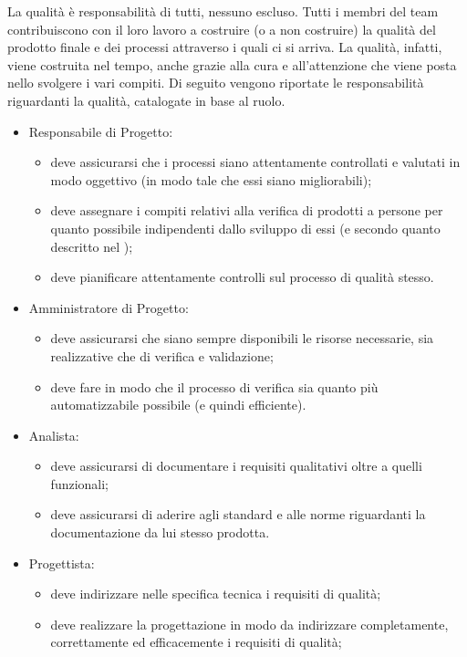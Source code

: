 			La qualità è responsabilità di tutti, nessuno escluso. Tutti i membri del team contribuiscono con il loro lavoro a costruire (o a non 
			costruire) la qualità del prodotto finale e dei processi attraverso i quali ci si arriva. La qualità, infatti, viene costruita nel tempo, 
			anche grazie alla cura e all'attenzione che viene posta nello svolgere i vari compiti.
			Di seguito vengono riportate le responsabilità riguardanti la qualità, catalogate in base al ruolo.
			\begin{itemize}
				\item Responsabile di Progetto:
				\begin{itemize}
					\item deve assicurarsi che i processi siano attentamente controllati e valutati in modo oggettivo (in modo tale che essi siano 
					migliorabili);
					\item deve assegnare i compiti relativi alla verifica di prodotti a persone per quanto possibile indipendenti dallo sviluppo di essi 
					(e secondo quanto descritto nel );
					\item deve pianificare attentamente controlli sul processo di qualità stesso.
				\end{itemize}
				\item Amministratore di Progetto:
				\begin{itemize}
					\item deve assicurarsi che siano sempre disponibili le risorse necessarie, sia realizzative che di verifica e validazione;
					\item deve fare in modo che il processo di verifica sia quanto più automatizzabile possibile (e quindi efficiente).
				\end{itemize}
				\item Analista:
				\begin{itemize}
					\item deve assicurarsi di documentare i requisiti qualitativi oltre a quelli funzionali;
					\item deve assicurarsi di aderire agli standard e alle norme riguardanti la documentazione da lui stesso prodotta.
				\end{itemize}
				\item Progettista:
				\begin{itemize}
					\item deve indirizzare nelle specifica tecnica i requisiti di qualità;
					\item deve realizzare la progettazione in modo da indirizzare completamente, correttamente ed efficacemente i requisiti di qualità;

\end{itemize}
\end{itemize}
